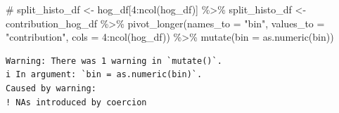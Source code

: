 \documentclass[
  letterpaper,
  DIV=11,
  numbers=noendperiod]{scrreprt}
\newenvironment{Shaded}{\begin{snugshade}}{\end{snugshade}}
\newcommand{\AttributeTok}[1]{\textcolor[rgb]{0.40,0.45,0.13}{#1}}
\newcommand{\CommentTok}[1]{\textcolor[rgb]{0.37,0.37,0.37}{#1}}
\newcommand{\DecValTok}[1]{\textcolor[rgb]{0.68,0.00,0.00}{#1}}
\newcommand{\FunctionTok}[1]{\textcolor[rgb]{0.28,0.35,0.67}{#1}}
\newcommand{\NormalTok}[1]{\textcolor[rgb]{0.00,0.23,0.31}{#1}}
\newcommand{\OtherTok}[1]{\textcolor[rgb]{0.00,0.23,0.31}{#1}}
\newcommand{\SpecialCharTok}[1]{\textcolor[rgb]{0.37,0.37,0.37}{#1}}
\newcommand{\StringTok}[1]{\textcolor[rgb]{0.13,0.47,0.30}{#1}}
\begin{document}
\begin{Shaded}
\begin{Highlighting}[]
\CommentTok{\# split\_histo\_df \textless{}{-} hog\_df[4:ncol(hog\_df)] \%\textgreater{}\%}
\NormalTok{split\_histo\_df }\OtherTok{\textless{}{-}}\NormalTok{ contribution\_hog\_df }\SpecialCharTok{\%\textgreater{}\%}
  \FunctionTok{pivot\_longer}\NormalTok{(}\AttributeTok{names\_to =} \StringTok{"bin"}\NormalTok{, }\AttributeTok{values\_to =} \StringTok{"contribution"}\NormalTok{, }\AttributeTok{cols =} \DecValTok{4}\SpecialCharTok{:}\FunctionTok{ncol}\NormalTok{(hog\_df)) }\SpecialCharTok{\%\textgreater{}\%}
  \FunctionTok{mutate}\NormalTok{(}\AttributeTok{bin =} \FunctionTok{as.numeric}\NormalTok{(bin))}
\end{Highlighting}
\end{Shaded}

\begin{verbatim}
Warning: There was 1 warning in `mutate()`.
i In argument: `bin = as.numeric(bin)`.
Caused by warning:
! NAs introduced by coercion
\end{verbatim}
\end{document}
